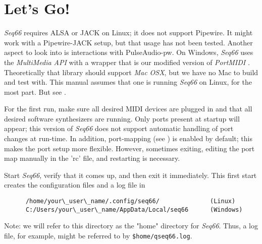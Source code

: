 %
%
%

\section{Let's Go!}
\label{sec:introduction_lets_go}

   \textsl{Seq66} requires ALSA or JACK on Linux;
   it does not support
   Pipewire.
   It might work with a Pipewire-JACK setup, but that usage has not been
   tested.
   Another aspect to look into is interactions with
   PulseAudio-pw.
   On Windows, \textsl{Seq66} uses the \textsl{MultiMedia API} with a wrapper
   that is our modified version of \textsl{PortMIDI} \cite{portmidi}.
   Theoretically that library should support
   \textsl{Mac OSX}, but we have no Mac to build and test with.
   This manual assumes that one is running \textsl{Seq66} on Linux, for the
   most part.
   But see .

   For the first run, make sure all desired MIDI devices are plugged in and
   that all desired software synthesizers are running.
   Only ports present at startup will appear; this version of
   \textsl{Seq66} does not
   support automatic handling of port changes at run-time.
   In addition, port-mapping (see ) is
   enabled by default; this makes the port setup more flexible.
   However, sometimes exiting, editing the port map manually in the 'rc' file,
   and restarting is necessary.

   Start \textsl{Seq66}, verify that it comes up, and then exit it
   immediately.
   This first start creates the configuration files and a log file in

   \begin{verbatim}
      /home/your\_user\_name/.config/seq66/              (Linux)
      C:/Users/your\_user\_name/AppData/Local/seq66      (Windows)
   \end{verbatim}

   Note: we will refer to this directory as the "home" directory
   for \textsl{Seq66}.
   Thus, a log file, for example, might be referred to by
   \texttt{\$home/qseq66.log}.

